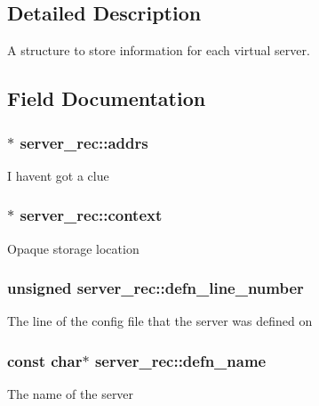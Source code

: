 \subsection{Detailed Description}
A structure to store information for each virtual server. 

\subsection{Field Documentation}
\subsubsection[{\texorpdfstring{addrs}{addrs}}]{$\ast$ server\+\_\+rec\+::addrs}\hypertarget{structserver__rec_a8caec41019feeb054418b6af738cdf67}{}\label{structserver__rec_a8caec41019feeb054418b6af738cdf67}
I haven\textquotesingle{}t got a clue 
\subsubsection[{\texorpdfstring{context}{context}}]{$\ast$ server\+\_\+rec\+::context}\hypertarget{structserver__rec_aa669ee5658c265c18f9bd7dfa080a26b}{}\label{structserver__rec_aa669ee5658c265c18f9bd7dfa080a26b}
Opaque storage location 
\subsubsection[{\texorpdfstring{defn\+\_\+line\+\_\+number}{defn_line_number}}]{\setlength{\rightskip}{0pt plus 5cm}unsigned server\+\_\+rec\+::defn\+\_\+line\+\_\+number}\hypertarget{structserver__rec_a58019551f088a36cd1e1d2a45f948375}{}\label{structserver__rec_a58019551f088a36cd1e1d2a45f948375}
The line of the config file that the server was defined on 
\subsubsection[{\texorpdfstring{defn\+\_\+name}{defn_name}}]{\setlength{\rightskip}{0pt plus 5cm}const char$\ast$ server\+\_\+rec\+::defn\+\_\+name}\hypertarget{structserver__rec_a7d6b00ad99a16b6a7f4911a7ed895d7c}{}\label{structserver__rec_a7d6b00ad99a16b6a7f4911a7ed895d7c}
The name of the server 
